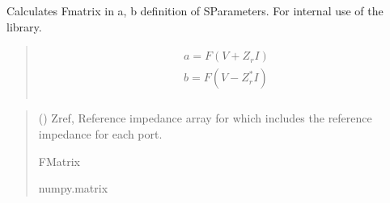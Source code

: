 \documentclass[letterpaper,10pt,english]{sphinxmanual}
\begin{document}
\begin{fulllineitems}
\begin{fulllineitems}
\begin{quote}
\begin{description}
\end{description}\end{quote}

\end{fulllineitems}


\begin{fulllineitems}
\label{\detokenize{touchstone:touchstone.spfile.Ffunc}}
\pysigstartsignatures
{}
\pysigstopsignatures
\sphinxAtStartPar
Calculates F\sphinxhyphen{}matrix in a, b definition of S\sphinxhyphen{}Parameters. For internal use of the library.
\begin{quote}
\begin{align*}\!\begin{aligned}
a=F(V+Z_rI)\\
b=F(V-Z_r^*I)\\
\end{aligned}\end{align*}\end{quote}
\begin{quote}\begin{description}
\sphinxAtStartPar
{} () \textendash{} Zref, Reference impedance array for which includes the reference impedance for each port.

\sphinxAtStartPar
F\sphinxhyphen{}Matrix

\sphinxAtStartPar
numpy.matrix

\end{description}\end{quote}

\end{fulllineitems}



\end{fulllineitems}
\end{document}
